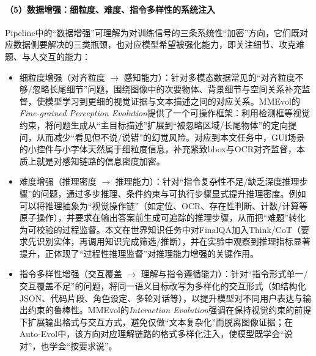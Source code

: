 \paragraph{（5）数据增强：细粒度、难度、指令多样性的系统注入}
Pipeline中的“数据增强”可理解为对训练信号的三条系统性“加密”方向，它们既对应数据侧要解决的三类瓶颈，也对应模型希望被强化能力，即关注细节、攻克难题、与人交互的能力：
\begin{itemize}
  \item 细粒度增强（对齐粒度 $\rightarrow$ 感知能力）：针对多模态数据常见的“对齐粒度不够/忽略长尾细节”问题，围绕图像中的次要物体、背景细节与空间关系补充监督，使模型学习到更细的视觉证据与文本描述之间的对应关系。MMEvol的\emph{Fine-grained Perception Evolution}提供了一个可操作框架\citep{xu2024mmevol}：利用检测框等视觉约束，将问题生成从“主目标描述”扩展到“被忽略区域/长尾物体”的定向提问，从而减少“看见但不说/说错”的幻觉风险。对应到本文任务中，GUI场景的小控件与小字体天然属于细粒度信息，补充紧致bbox与OCR对齐监督，本质上就是对感知链路的信息密度加密。
  \item 难度增强（推理密度 $\rightarrow$ 推理能力）：针对“指令复杂性不足/缺乏深度推理步骤”的问题，通过多步推理、条件约束与可执行步骤显式提升推理密度。例如可以将推理抽象为“视觉操作链”（如定位、OCR、存在性判断、计数/计算等原子操作），并要求在输出答案前生成可追踪的推理步骤，从而把“难题”转化为可校验的过程监督。本文在世界知识任务中对FinalQA加入Think/CoT（要求先识别实体，再调用知识完成筛选/推断），并在实验中观察到推理指标显著提升，正体现了“过程性推理监督”对推理能力增强的关键作用。
  \item 指令多样性增强（交互覆盖 $\rightarrow$ 理解与指令遵循能力）：针对“指令形式单一/交互覆盖不足”的问题，将同一语义目标改写为多样化的交互形式（如结构化JSON、代码片段、角色设定、多轮对话等），以提升模型对不同用户表达与输出约束的鲁棒性。MMEvol的\emph{Interaction Evolution}强调在保持视觉约束的前提下扩展输出格式与交互方式\citep{xu2024mmevol}，避免仅做“文本复杂化”而脱离图像证据；在Auto-Evol中，该方向对应理解链路的格式多样化注入，使模型既学会“说对”，也学会“按要求说”。
\end{itemize}

